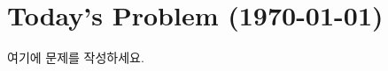 \documentclass[12pt]{article}
\begin{document}
\section*{Today's Problem (\today)}
\begin{problem}
여기에 문제를 작성하세요.
\end{problem}
\end{document}
